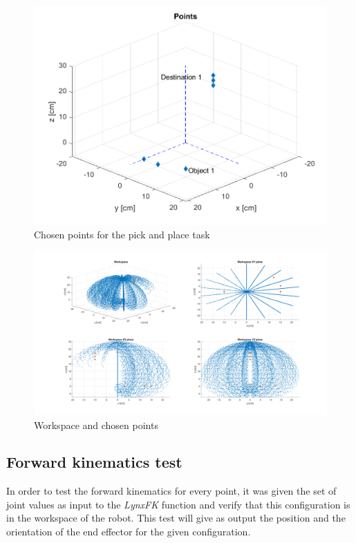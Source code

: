 \documentclass{article}
\begin{document}
\begin{figure}
\begin{center}
\includegraphics[width=\textwidth]{images/Points}
\caption{Chosen points for the pick and place task}
\label{fig:points.points}
\end{center}
\end{figure}

\begin{figure}
\begin{center}
\includegraphics[width=\textwidth]{images/Workspace_Points}
\caption{Workspace and chosen points}
\label{fig:points.ws_points}
\end{center}
\end{figure}

\subsection{Forward kinematics test}
In order to test the forward kinematics for every point, it was given the set of joint values as input to the \textit{LynxFK} function and verify that this configuration is in the workspace of the robot. This test will give as output the position and the orientation of the end effector for the given configuration.
\end{document}
